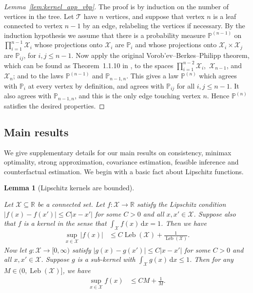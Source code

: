 \documentclass[11pt,lof]{puthesis}
\renewcommand{\P}{\ensuremath{\mathbb{P}}}
\newcommand{\R}{\ensuremath{\mathbb{R}}}
\newcommand{\cX}{\ensuremath{\mathcal{X}}}
\newcommand{\cT}{\ensuremath{\mathcal{T}}}
\DeclareMathOperator{\Leb}{Leb}
\newcommand{\diff}[1]{\,\mathrm{d}#1}
\theoremstyle{break}
\newtheorem{lemma}{Lemma}[section]
\theoremstyle{proof}
\newtheorem{proof}{Proof}
\begin{document}
\begin{proof}[Lemma~\ref{lem:kernel_app_vbp}]

  The proof is by induction on the number of vertices in the tree.
  Let $\cT$ have $n$ vertices,
  and suppose that vertex $n$ is a leaf
  connected to vertex $n-1$ by an edge,
  relabeling the vertices if necessary.
  By the induction hypothesis we assume that there is a
  probability measure $\P^{(n-1)}$
  on $\prod_{i=1}^{n-1} \cX_i$
  whose projections onto $\cX_i$ are $\P_i$
  and whose projections onto $\cX_i \times \cX_j$ are $\P_{i j}$,
  for $i,j \leq n-1$.
  Now apply the original
  Vorob'ev--Berkes--Philipp theorem,
  which can be found as Theorem~1.1.10 in
  \citet{dudley1999uniform},
  to the spaces
  $\prod_{i=1}^{n-2} \cX_i$,\,
  $\cX_{n-1}$, and
  $\cX_n$;
  and to the laws
  $\P^{(n-1)}$
  and
  $\P_{n-1, n}$.
  This gives a law $\P^{(n)}$
  which agrees with $\P_i$
  at every vertex by definition,
  and agrees with
  $\P_{i j}$ for all $i,j \leq n-1$.
  It also agrees with $\P_{n-1,n}$,
  and this is the only edge touching vertex $n$.
  Hence $\P^{(n)}$ satisfies the desired properties.
\end{proof}

\subsection{Main results}
\label{sec:kernel_app_main}

We give supplementary details for our main results on consistency, minimax
optimality, strong approximation, covariance estimation, feasible inference and
counterfactual estimation.
We begin with a basic fact about Lipschitz functions.

\begin{lemma}[Lipschitz kernels are bounded]
  \label{lem:kernel_app_lipschitz_kernels_bounded}

  Let $\cX \subseteq \R$ be a connected set.
  Let $f: \cX \to \R$ satisfy the Lipschitz condition
  $|f(x) - f(x')| \leq C |x-x'|$ for some $C > 0$
  and all $x, x' \in \cX$.
  Suppose also that $f$ is a kernel in the sense that
  $\int_\cX f(x) \diff{x} = 1$.
  Then we have
  \begin{align*}
    \sup_{x \in \cX} |f(x)|
    &\leq
    C \Leb(\cX) + \frac{1}{\Leb(\cX)}.
  \end{align*}
  Now let $g: \cX \to [0,\infty)$ satisfy
  $|g(x) - g(x')| \leq C |x-x'|$ for some $C > 0$
  and all $x, x' \in \cX$.
  Suppose $g$ is a sub-kernel with
  $\int_\cX g(x) \diff{x} \leq 1$.
  Then for any $M \in \big(0, \Leb(\cX)\big]$,
  we have
  \begin{align*}
    \sup_{x \in \cX} f(x)
    &\leq
    C M + \frac{1}{M}.
  \end{align*}

\end{lemma}
\end{document}
